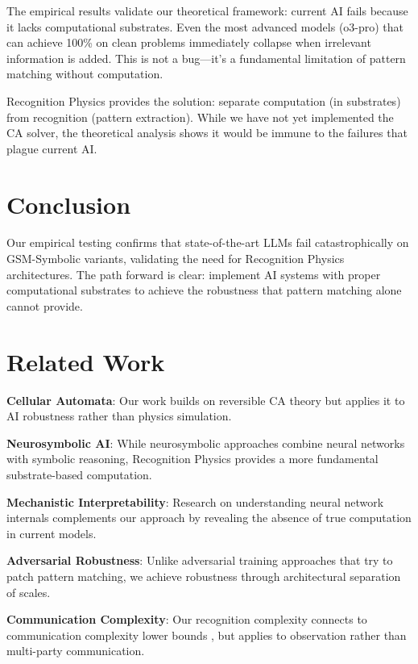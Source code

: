\documentclass[11pt,letterpaper]{article}
\theoremstyle{plain}
\theoremstyle{definition}
\theoremstyle{remark}
\begin{document}
The empirical results validate our theoretical framework: current AI fails because it lacks computational substrates. Even the most advanced models (o3-pro) that can achieve 100\% on clean problems immediately collapse when irrelevant information is added. This is not a bug—it's a fundamental limitation of pattern matching without computation.

Recognition Physics provides the solution: separate computation (in substrates) from recognition (pattern extraction). While we have not yet implemented the CA solver, the theoretical analysis shows it would be immune to the failures that plague current AI.

\section{Conclusion}

Our empirical testing confirms that state-of-the-art LLMs fail catastrophically on GSM-Symbolic variants, validating the need for Recognition Physics architectures. The path forward is clear: implement AI systems with proper computational substrates to achieve the robustness that pattern matching alone cannot provide.

\section{Related Work}

\textbf{Cellular Automata}: Our work builds on reversible CA theory \cite{margolus1984physics,fredkin1982conservative} but applies it to AI robustness rather than physics simulation.

\textbf{Neurosymbolic AI}: While neurosymbolic approaches \cite{garcez2019neural} combine neural networks with symbolic reasoning, Recognition Physics provides a more fundamental substrate-based computation.

\textbf{Mechanistic Interpretability}: Research on understanding neural network internals \cite{olah2020zoom} complements our approach by revealing the absence of true computation in current models.

\textbf{Adversarial Robustness}: Unlike adversarial training approaches \cite{madry2018towards} that try to patch pattern matching, we achieve robustness through architectural separation of scales.

\textbf{Communication Complexity}: Our recognition complexity connects to communication complexity lower bounds \cite{kushilevitz1997communication}, but applies to observation rather than multi-party communication.
\end{document}
